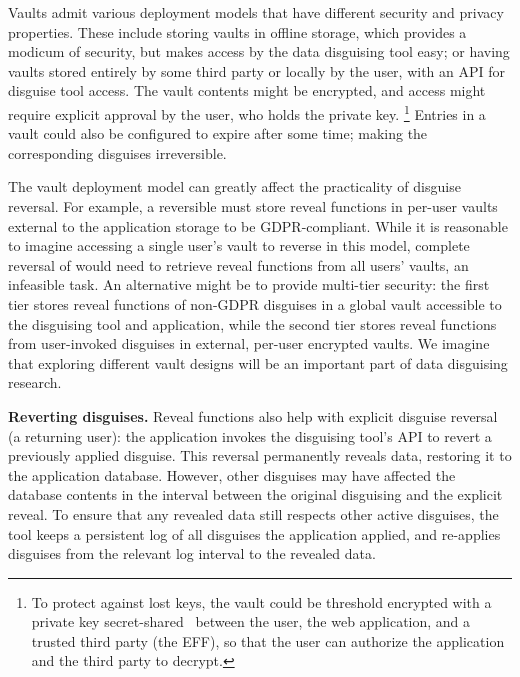 %
Vaults admit various deployment models that have different security and privacy
properties.
%
%
These include storing vaults in offline storage, which provides a modicum of security,
but makes access by the data disguising tool easy; or having vaults stored entirely by
some third party or locally by the user, with an API for disguise tool access.
%
The vault contents might be encrypted, and access might require explicit approval
by the user, who holds the private key.
%
\footnote{To protect against lost keys, the vault could be threshold encrypted with a private key
secret-shared~\cite{secretsharing} between the user, the web application, and a trusted third party
(\eg the EFF), so that the user can authorize the application and the third party to decrypt.}
%
Entries in a vault could also be configured to expire after some time; making the
corresponding disguises irreversible.
%

%
The vault deployment model can greatly affect the practicality of disguise
reversal.
%
For example, a reversible \gdpr must store reveal functions in per-user vaults
external to the application storage to be GDPR-compliant.
%
While it is reasonable to imagine accessing a single user's vault to reverse \gdpr in
this model, complete reversal of \ca would need to retrieve reveal functions from
all users' vaults, an infeasible task.
%
An alternative might be to provide multi-tier security: the first tier stores reveal
functions of non-GDPR disguises in a global vault accessible to the disguising tool
and application, while the second tier stores reveal functions from user-invoked
disguises in external, per-user encrypted vaults.
%
We imagine that exploring different vault designs will be an important part of
data disguising research.
%

\textbf{Reverting disguises.}
%
Reveal functions also help with explicit disguise reversal (\eg a returning user): the
application invokes the disguising tool's API to revert a previously applied disguise.
%
This reversal permanently reveals data, restoring it to the application database.
%
However, other disguises may have affected the database contents in the interval between
the original disguising and the explicit reveal.
%
To ensure that any revealed data still respects other active disguises, the tool keeps
a persistent log of all disguises the application applied, and re-applies disguises from
the relevant log interval to the revealed data.
%

